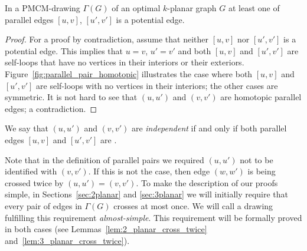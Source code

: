 
\begin{property}
In a PMCM-drawing $\Gamma(G)$ of an optimal $k$-planar graph $G$ at least one of parallel edges $[u,v]$, $[u',v']$ is a potential edge.
\label{prp:parallel}
\end{property}
\begin{proof}
For a proof by contradiction, assume that neither $[u,v]$ nor $[u',v']$ is a potential edge. This implies that $u=v$, $u'=v'$ and both $[u,v]$ and $[u',v']$ are self-loops that have no vertices in their interiors or their exteriors. Figure~\ref{fig:parallel_pair_homotopic} illustrates the case where both $[u,v]$ and $[u',v']$ are self-loops with no vertices in their interiors; the other cases are symmetric. It is not hard to see that $(u,u')$ and $(v,v')$ are homotopic parallel edges; a contradiction.
\end{proof}
%
We say that $(u,u')$ and $(v,v')$ are \emph{independent} if and only if both parallel edges $[u,v]$ and $[u',v']$ are \pes.

\begin{remark}
Note that in the definition of parallel pairs we required $(u,u')$ not to be identified with $(v,v')$. If this is not the case, then edge $(w,w')$ is being crossed twice by $(u,u') = (v,v')$. To make the description of our proofs simple, in Sections~\ref{sec:2planar} and \ref{sec:3planar} we will initially require that every pair of edges in $\Gamma(G)$ crosses at most once. We will call a drawing fulfilling this requirement \emph{almost-simple}. This requirement will be formally proved in both cases (see Lemmas~\ref{lem:2_planar_cross_twice} and~\ref{lem:3_planar_cross_twice}).    
\end{remark}




